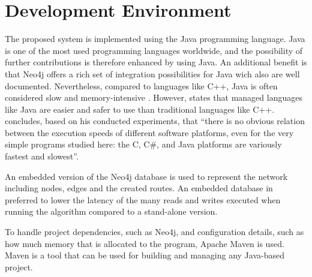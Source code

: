 \section{Development Environment}

The proposed system is implemented using the Java programming language. Java is one of the most used programming languages worldwide, and the possibility of further contributions is therefore enhanced by using Java. An additional benefit is that Neo4j offers a rich set of integration possibilities for Java wich also are well documented. Nevertheless, compared to languages like C++, Java is often considered slow and memory-intensive \citep{alnaser12}. However, \citet{sestoft10} states that managed languages like Java are easier and safer to use than traditional languages like C++. \citet{sestoft10} concludes, based on his conducted experiments, that ``there is no obvious relation between the execution speeds of different software platforms, even for the very simple programs studied here: the C, C\#, and Java platforms are variously fastest and slowest''.

An embedded version of the Neo4j database is used to represent the network including nodes, edges and the created routes. An embedded database in preferred to lower the latency of the many reads and writes executed when running the algorithm compared to a stand-alone version. 

To handle project dependencies, such as Neo4j, and configuration details, such as how much memory that is allocated to the program, Apache Maven\citep{website:maven} is used. Maven is a tool that can be used for building and managing any Java-based project. 
